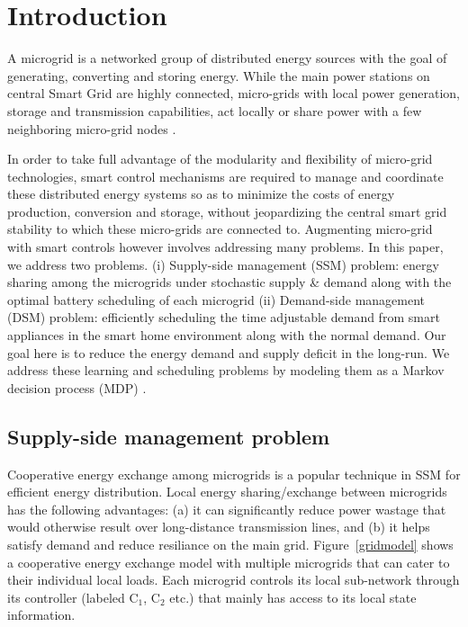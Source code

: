 \section{Introduction}

A microgrid is a networked group of distributed energy sources with the goal of generating, converting and storing energy. While the main power stations on central Smart Grid are highly connected, micro-grids with local power generation, storage and transmission capabilities, act locally or share power with a few neighboring micro-grid nodes \cite{farhangi2010path}.

In order to take full advantage of the modularity and flexibility of micro-grid technologies, smart control mechanisms are required to manage and coordinate these distributed energy systems so as to minimize the costs of energy production, conversion and storage, without jeopardizing the central smart grid stability to which these micro-grids are connected to. Augmenting micro-grid with smart controls however involves addressing many problems. In this paper, we address two  problems. (i) Supply-side management (SSM) problem: energy sharing among the microgrids under stochastic supply \& demand along with the optimal battery scheduling of each microgrid (ii) Demand-side management (DSM) problem: efficiently scheduling the time adjustable demand from smart appliances in the smart home environment along with the normal demand. Our goal here is to reduce the energy demand and supply deficit in the long-run. We address these learning and scheduling problems by modeling them as a Markov decision process (MDP) \cite{puterman2014markov}.

\subsection{Supply-side management problem}
Cooperative energy exchange among microgrids is a popular technique in SSM for efficient energy distribution.  Local energy sharing/exchange between microgrids has the following advantages:
(a) it can significantly reduce power wastage that would otherwise result over long-distance transmission lines, and (b) it helps satisfy demand and reduce resiliance on the main grid. Figure~\ref{gridmodel} shows a cooperative energy exchange model with multiple microgrids that can cater to their individual local loads. Each microgrid controls its local sub-network through its controller (labeled $\mbox{C}_1$, $\mbox{C}_2$ etc.) that mainly has access to its local state information.


